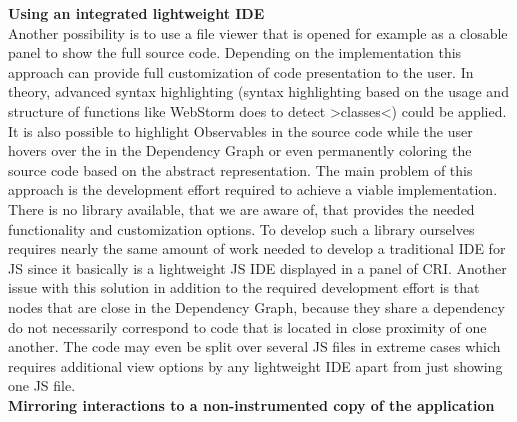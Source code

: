 \textbf{Using an integrated lightweight IDE}\\
Another possibility is to use a file viewer that is opened for example as a closable panel to show the full source code. Depending on the implementation this approach can provide full customization of code presentation to the user. In theory, advanced syntax highlighting (syntax highlighting based on the usage and structure of functions like WebStorm does to detect >classes<) could be applied. It is also possible to highlight Observables in the source code while the user hovers over the in the Dependency Graph or even permanently coloring the source code based on the abstract representation. The main problem of this approach is the development effort required to achieve a viable implementation. There is no library available, that we are aware of, that provides the needed functionality and customization options. To develop such a library ourselves requires nearly the same amount of work needed to develop a traditional IDE for JS since it basically is a lightweight JS IDE displayed in a panel of CRI. Another issue with this solution in addition to the required development effort is that nodes that are close in the Dependency Graph, because they share a dependency do not necessarily correspond to code that is located in close proximity of one another. The code may even be split over several JS files in extreme cases which requires additional view options by any lightweight IDE apart from just showing one JS file.\\ %
\textbf{Mirroring interactions to a non-instrumented copy of the application}\\
